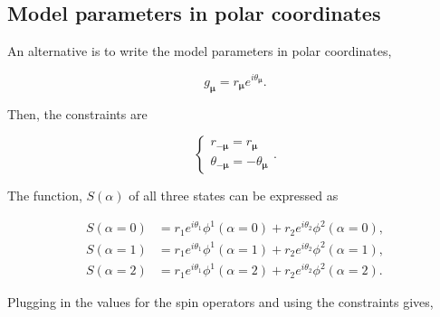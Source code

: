 \subsection{Model parameters in polar coordinates}\label{sec:polar_coord}

An alternative is to write the model parameters in polar coordinates,

\begin{equation}
    g_{\boldsymbol{\mu}} = r_{\boldsymbol{\mu}} e^{i \theta_{\boldsymbol{\mu}}}.
\end{equation}

\noindent
Then, the constraints are

\begin{equation}
    \begin{cases}
        r_{-\boldsymbol{\mu}} = r_{\boldsymbol{\mu}}\\
        \theta_{-\boldsymbol{\mu}} = -\theta_{\boldsymbol{\mu}}
    \end{cases}
    .
\end{equation}

\noindent
The function, $S(\alpha)$ of all three states can be expressed as

\begin{align*}
    S(\alpha=0) &= r_1 e^{i \theta_1} \phi^1(\alpha=0) + r_2 e^{i \theta_2} \phi^2(\alpha=0),\\
    S(\alpha=1) &= r_1 e^{i \theta_1} \phi^1(\alpha=1) + r_2 e^{i \theta_2} \phi^2(\alpha=1),\\
    S(\alpha=2) &= r_1 e^{i \theta_1} \phi^1(\alpha=2) + r_2 e^{i \theta_2} \phi^2(\alpha=2).
\end{align*}

\noindent
Plugging in the values for the spin operators and using the constraints gives,

